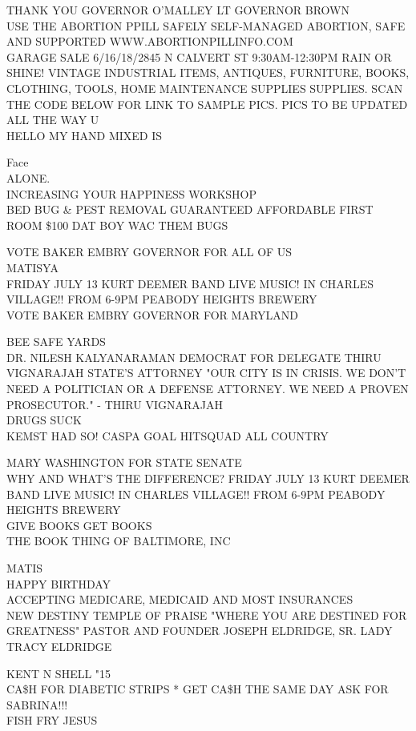 \documentclass[10pt,letterpaper]{article}
\begin{document}
THANK YOU GOVERNOR O'MALLEY LT GOVERNOR BROWN\\
USE THE ABORTION PPILL SAFELY SELF{-}MANAGED ABORTION, SAFE AND SUPPORTED WWW.ABORTIONPILLINFO.COM\\
GARAGE SALE 6/16/18/2845 N CALVERT ST 9:30AM{-}12:30PM RAIN OR SHINE!  VINTAGE INDUSTRIAL ITEMS, ANTIQUES, FURNITURE, BOOKS, CLOTHING, TOOLS, HOME MAINTENANCE SUPPLIES SUPPLIES.  SCAN THE CODE BELOW FOR LINK TO SAMPLE PICS.  PICS TO BE UPDATED ALL THE WAY U\\
HELLO MY HAND MIXED IS

Face\\
ALONE.\\
INCREASING YOUR HAPPINESS WORKSHOP\\
BED BUG \& PEST REMOVAL GUARANTEED AFFORDABLE FIRST ROOM \$100 DAT BOY WAC THEM BUGS

VOTE BAKER EMBRY GOVERNOR FOR ALL OF US\\
MATISYA\\
FRIDAY JULY 13 KURT DEEMER BAND LIVE MUSIC!  IN CHARLES VILLAGE!!  FROM 6{-}9PM PEABODY HEIGHTS BREWERY\\
VOTE BAKER EMBRY GOVERNOR FOR MARYLAND

BEE SAFE YARDS\\
DR. NILESH KALYANARAMAN DEMOCRAT FOR DELEGATE THIRU VIGNARAJAH STATE'S ATTORNEY "OUR CITY IS IN CRISIS.  WE DON'T NEED A POLITICIAN OR A DEFENSE ATTORNEY.  WE NEED A PROVEN PROSECUTOR." {-} THIRU VIGNARAJAH\\
DRUGS SUCK\\
KEMST HAD SO!  CASPA GOAL HITSQUAD ALL COUNTRY

MARY WASHINGTON FOR STATE SENATE\\
WHY AND WHAT'S THE DIFFERENCE?  FRIDAY JULY 13 KURT DEEMER BAND LIVE MUSIC!  IN CHARLES VILLAGE!!  FROM 6{-}9PM PEABODY HEIGHTS BREWERY\\
GIVE BOOKS GET BOOKS\\
THE BOOK THING OF BALTIMORE, INC

MATIS\\
HAPPY BIRTHDAY\\
ACCEPTING MEDICARE, MEDICAID AND MOST INSURANCES\\
NEW DESTINY TEMPLE OF PRAISE "WHERE YOU ARE DESTINED FOR GREATNESS"  PASTOR AND FOUNDER JOSEPH ELDRIDGE, SR.  LADY TRACY ELDRIDGE

KENT N SHELL "15\\
CA\$H FOR DIABETIC STRIPS * GET CA\$H THE SAME DAY ASK FOR SABRINA!!!\\
FISH FRY JESUS
\end{document}
